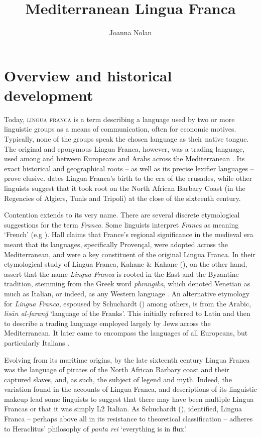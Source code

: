 \documentclass[output=paper]{langsci/langscibook}
\title{Mediterranean Lingua Franca}
\author{Joanna Nolan\affiliation{SOAS University of London}}
\begin{document}
	
\section{Overview and historical development}
	
	Today, \textsc{lingua franca} is a term describing a language used by two or more linguistic groups as a means of communication, often for economic motives. Typically, none of the groups speak the chosen language as their native tongue. The original and eponymous Lingua Franca, however, was a trading language, used among and between Europeans and Arabs across the Mediterranean \citep{KahaneKahane1976}. Its exact historical and geographical roots – as well as its precise lexifier languages – prove elusive. \citet{Hall1966} dates Lingua Franca’s birth to the era of the crusades, while other linguists \citep{Cifoletti2004,Minervini1996} suggest that it took root on the North African Barbary Coast (in the Regencies of Algiers, Tunis and Tripoli) at the close of the sixteenth century. 
	
	Contention extends to its very name. There are several discrete etymological suggestions for the term \textit{Franca}.  Some linguists interpret \textit{Franca} as meaning ‘French’ (e.g \citealt[3]{Hall1966}). Hall claims that France’s regional significance in the medieval era meant that its languages, specifically Provençal, were adopted across the Mediterranean, and were a key constituent of the original Lingua Franca. In their etymological study of Lingua Franca, Kahane \& Kahane (\citeyear[25]{KahaneKahane1976}), on the other hand, assert that the name \textit{Lingua Franca} is rooted in the East and the Byzantine tradition, stemming from the Greek word \textit{phrangika}, which denoted Venetian as much as Italian, or indeed, as any Western language \citep[31]{KahaneKahane1976}. An alternative etymology for \textit{Lingua Franca}, espoused by Schuchardt (\citeyear[74]{Schuchardt1909}) among others, is from the Arabic, \textit{lisān al-faranǧ} ‘language of the Franks’. This initially referred to Latin and then to describe a trading language employed largely by Jews across the Mediterranean. It later came to encompass the languages of all Europeans, but particularly Italians \citep[26]{KahaneKahane1976}.  
	
	Evolving from its maritime origins, by the late sixteenth century Lingua Franca was the language of pirates of the North African Barbary coast and their captured slaves, and, as such, the subject of legend and myth. Indeed, the variation found in the accounts of Lingua Franca, and descriptions of its linguistic makeup lead some linguists \citep{Minervini1996,Mori2016} to suggest that there may have been multiple Lingua Francas or that it was simply L2 Italian. As Schuchardt (\citeyear[88]{Schuchardt1909}), identified, Lingua Franca – perhaps above all in its resistance to theoretical classification – adheres to Heraclitus’ philosophy of \textit{panta rei}  ‘everything is in flux’. 
	
\end{document}
